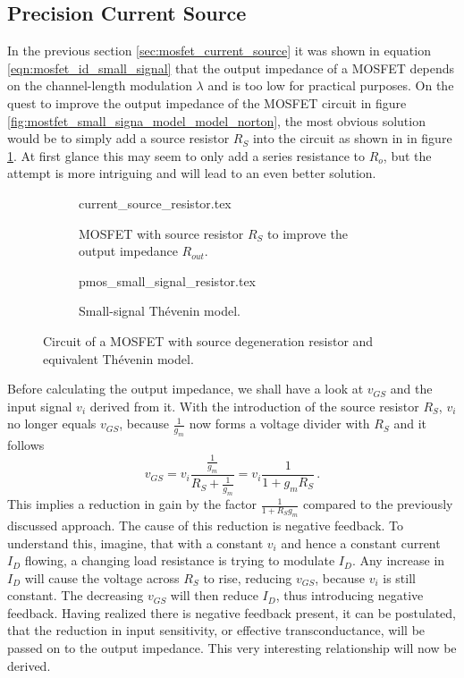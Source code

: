 \subsection{Precision Current Source}%
\label{sec:precision_current_source}
In the previous section \ref{sec:mosfet_current_source} it was shown in equation \ref{eqn:mosfet_id_small_signal} that the output impedance of a MOSFET depends on the channel-length modulation $\lambda$ and is too low for practical purposes. On the quest to improve the output impedance of the MOSFET circuit in figure \ref{fig:mostfet_small_signa_model_model_norton}, the most obvious solution would be to simply add a source resistor $R_S$ into the circuit as shown in in figure \ref{fig:pmos_current_source_resistor}. At first glance this may seem to only add a series resistance to $R_o$, but the attempt is more intriguing and will lead to an even better solution.

\begin{figure}[ht]
    \centering
    \begin{subfigure}[t]{0.45\linewidth}
        \centering
        {current_source_resistor.tex}
        \caption{MOSFET with source resistor $R_S$ to improve the output impedance $R_{out}$.}
        \label{fig:pmos_current_source_resistor}
    \end{subfigure}%
    \begin{subfigure}[t]{0.45\linewidth}
         \centering
         {pmos_small_signal_resistor.tex}
         \caption{Small-signal Thévenin model.}
         \label{fig:pmos_current_source_resistor_small_signal}
     \end{subfigure}%
     \caption{Circuit of a MOSFET with source degeneration resistor and equivalent Thévenin model.}
\end{figure}

Before calculating the output impedance, we shall have a look at $v_{GS}$ and the input signal $v_i$ derived from it. With the introduction of the source resistor $R_S$, $v_i$ no longer equals $v_{GS}$, because $\frac{1}{g_m}$ now forms a voltage divider with $R_S$ and it follows
\begin{equation}
    v_{GS} = v_i \frac{\frac{1}{g_m}}{R_S + \frac{1}{g_m}} = v_i \frac{1}{1 + g_m R_S} \,.
\end{equation}
This implies a reduction in gain by the factor $\frac{1}{1 + R_S g_m}$ compared to the previously discussed approach. The cause of this reduction is negative feedback. To understand this, imagine, that with a constant $v_i$ and hence a constant current $I_D$ flowing, a changing load resistance is trying to modulate $I_D$. Any increase in $I_D$ will cause the voltage across $R_S$ to rise, reducing $v_{GS}$, because $v_i$ is still constant. The decreasing $v_{GS}$ will then reduce $I_D$, thus introducing negative feedback. Having realized there is negative feedback present, it can be postulated, that the reduction in input sensitivity, or effective transconductance, will be passed on to the output impedance. This very interesting relationship will now be derived.

